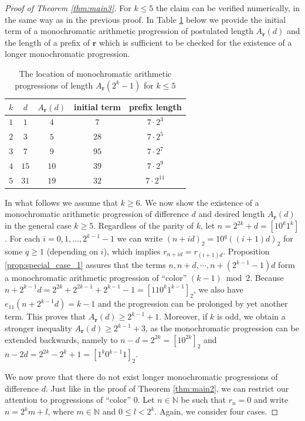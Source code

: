 \documentclass[a4paper,11pt]{amsart}
\theoremstyle{definition}
\newcommand{\N}{\mathbb{N}}
\begin{document}
\begin{proof}[Proof of Theorem \ref{thm:main3}]
For $k \leq 5$ the claim can be verified numerically, in the same way as in the previous proof. In Table \ref{tab:progressions2} below we provide the initial term of a monochromatic arithmetic progression of postulated length $A_{\mathbf{r}}(d)$ and the length of a prefix of $\mathbf{r}$ which is sufficient to be checked for the existence of a longer monochromatic progression.
\begin{table}[h] 
\begin{tabular}{ccccc}
$k$ & $d$  & $A_{\mathbf{r}}(d)$ & initial term & prefix length \\ \hline
$1$ & $1$  & $4$    & $7$      & $7 \cdot 2^3$  \\
$2$ & $3$  & $5$    & $28$     & $7 \cdot 2^5$  \\
$3$ & $7$  & $9$    & $95$     & $7 \cdot 2^7$  \\
$4$ & $15$ & $10$   & $39$     & $7 \cdot 2^9$  \\
$5$ & $31$ & $19$   & $32$     & $7 \cdot 2^{11}$       
\end{tabular}
\caption{\label{tab:progressions2}The location of monochromatic arithmetic progressions of length $A_{\mathbf{r}}(2^k-1)$ for $k \leq 5$}
\end{table}

In what follows we assume that $k \geq 6$. We now show the existence of a monochromatic arithmetic progression of difference $d$ and desired length $A_{\mathbf{r}}(d)$ in the general case $k \geq 5$. Regardless of the parity of $k$, let $n = 2^{2k}+d = [1 0^{k} 1^k]$. For each $i=0,1, \ldots, 2^{k-1}-1$ we can write $(n+id)_2 = 1 0^q ((i+1)d)_2$ for some $q \geq 1$ (depending on $i$), which implies $r_{n + id} = r_{(i+1)d}$. Proposition \ref{prop:special_case_1} assures that the terms $n, n+d, \cdots, n + (2^{k-1}-1)d$ form a monochromatic arithmetic progression of ``color'' $(k-1) \bmod{2}$. Because $n+ 2^{k-1}d = 2^{2k} + 2^{2k-1} + 2^{k-1} - 1 = [11 0^k 1^{k-1}]_2$, we also have $e_{11}(n+ 2^{k-1}d) = k-1$ and the progression can be prolonged by yet another term. This proves that $A_{\mathbf{r}}(d) \geq 2^{k-1} + 1$. Moreover, if $k$ is odd, we obtain a stronger inequality $A_{\mathbf{r}}(d) \geq 2^{k-1} + 3$, as the monochromatic progression can be extended backwards, namely to $n-d = 2^{2k} = [10^{2k}]_2$ and $n-2d = 2^{2k} - 2^k +1 = [1^k 0^{k-1} 1]_2$.

We now prove that there do not exist longer monochromatic progressions of difference $d$. Just like in the proof of Theorem \ref{thm:main2}, we can restrict our attention to progressions of ``color'' $0$. Let $n \in \N$ be such that $r_n = 0$ and write $n = 2^k m + l$, where $m \in \N$ and $0 \leq l < 2^k$. Again, we consider four cases.


\end{proof}
\end{document}

